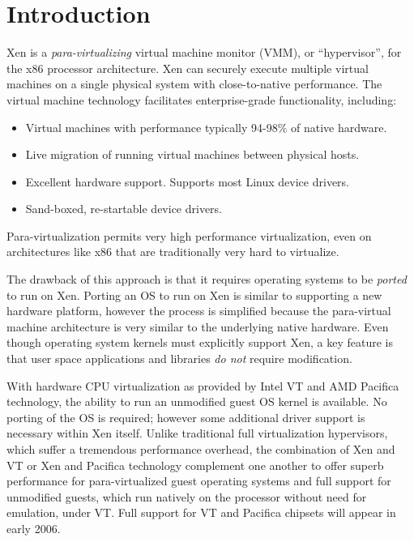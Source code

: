 \chapter{Introduction}


Xen is a \emph{para-virtualizing} virtual machine monitor (VMM), or
``hypervisor'', for the x86 processor architecture. Xen can securely
execute multiple virtual machines on a single physical system with
close-to-native performance. The virtual machine technology facilitates
enterprise-grade functionality, including:

\begin{itemize}
\item Virtual machines with performance typically 94-98\% of native hardware.
\item Live migration of running virtual machines between physical hosts.
\item Excellent hardware support. Supports most Linux device drivers.
\item Sand-boxed, re-startable device drivers.
\end{itemize}

Para-virtualization permits very high performance virtualization, even
on architectures like x86 that are traditionally very hard to
virtualize.

The drawback of this approach is that it requires operating systems to
be \emph{ported} to run on Xen. Porting an OS to run on Xen is similar
to supporting a new hardware platform, however the process is simplified
because the para-virtual machine architecture is very similar to the
underlying native hardware. Even though operating system kernels must
explicitly support Xen, a key feature is that user space applications
and libraries \emph{do not} require modification.

With hardware CPU virtualization as provided by Intel VT and AMD
Pacifica technology, the ability to run an unmodified guest OS kernel is
available.  No porting of the OS is required; however some additional
driver support is necessary within Xen itself.  Unlike traditional full
virtualization hypervisors, which suffer a tremendous performance
overhead, the combination of Xen and VT or Xen and Pacifica technology
complement one another to offer superb performance for para-virtualized
guest operating systems and full support for unmodified guests, which
run natively on the processor without need for emulation, under VT.
Full support for VT and Pacifica chipsets will appear in early 2006.

